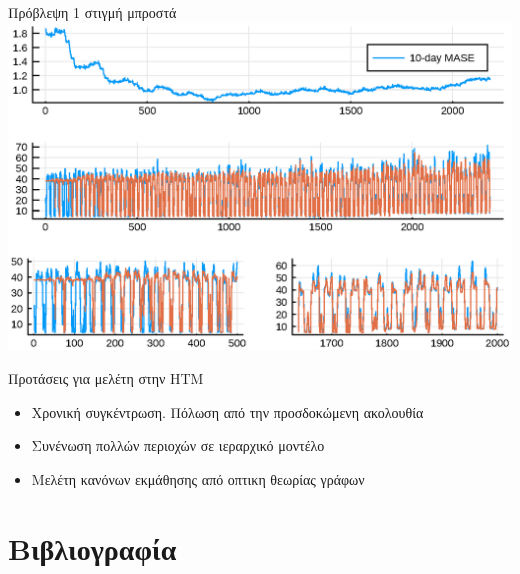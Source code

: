 \documentclass[10pt,lualatex]{beamer}
\begin{document}
\begin{frame}{Πρόβλεψη 1 στιγμή μπροστά}
  \centering
  \includegraphics[width=\textwidth]{../figures/tm1.eps}
\end{frame}

\begin{frame}{Προτάσεις για μελέτη στην HTM}
  \begin{itemize}
    \item Χρονική συγκέντρωση. Πόλωση από την προσδοκώμενη ακολουθία \cite{hawkinsTheoryHowColumns2017}
    \item Συνένωση πολλών περιοχών σε ιεραρχικό μοντέλο \cite{hawkinsFrameworkIntelligenceCortical2019}
    \item Μελέτη κανόνων εκμάθησης από οπτικη θεωρίας γράφων \cite{kipouridisConvergenceNetworkSystems2019}
  \end{itemize}
\end{frame}

\section{Βιβλιογραφία}
\begin{frame}
  \printbibliography
\end{frame}
\end{document}
